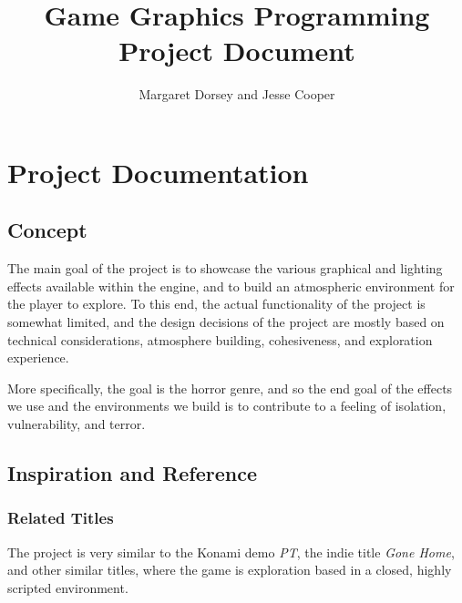 \documentclass[11pt]{article} %
\title{Game Graphics Programming Project Document}
\author{Margaret Dorsey and Jesse Cooper}
\begin{document}
\maketitle

\section{Project Documentation}

\subsection{Concept}
\par The main goal of the project is to showcase the various graphical and lighting
effects available within the engine, and to build an atmospheric environment for the player to explore. To this end, the actual functionality of the project is somewhat limited, and the design decisions of the project are mostly based on technical considerations, atmosphere building, cohesiveness, and exploration experience.
\par More specifically, the goal is the horror genre, and so the end goal of the effects we use and the environments we build is to contribute to a feeling of isolation, vulnerability, and terror.
\subsection{Inspiration and Reference}
\subsubsection{Related Titles}
The project is very similar to the Konami demo \textit{PT}, the indie title \textit{Gone Home}, and other similar titles, where the game is exploration based in a closed, highly scripted environment.
\end{document}
